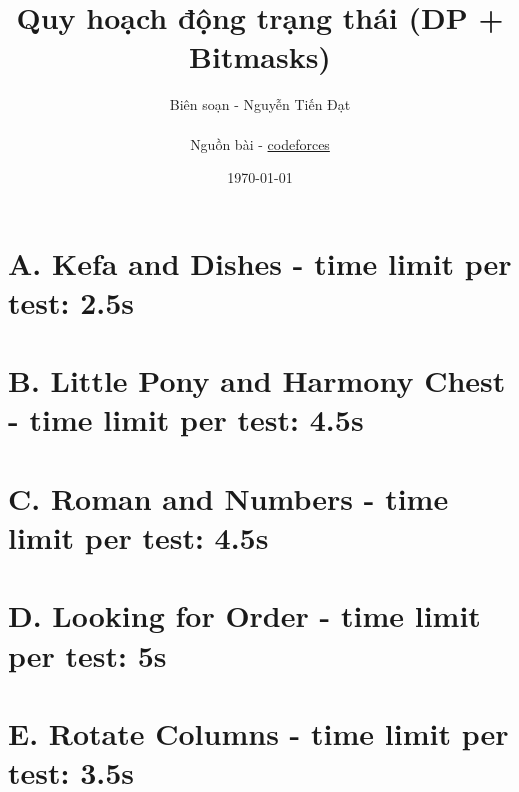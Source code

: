 \documentclass[a4paper,17pt]{article}
\title{Quy hoạch động trạng thái (DP + Bitmasks)}
\author{
    Biên soạn - Nguyễn Tiến Đạt \\ \\
    Nguồn bài - \href{https://codeforces.com/}{codeforces}
}
\date{\today}
\begin{document}
    \maketitle
    \newpage
    \tableofcontents
    \newpage
    \section{\textbf{A. Kefa and Dishes - time limit per test: 2.5s}}
        
    \section{\textbf{B. Little Pony and Harmony Chest - time limit per test: 4.5s}}
        
    \section{\textbf{C. Roman and Numbers - time limit per test: 4.5s}}
        
    \section{\textbf{D. Looking for Order - time limit per test: 5s}}
        
        \newpage
    \section{\textbf{E. Rotate Columns - time limit per test: 3.5s}}
        
\end{document}
